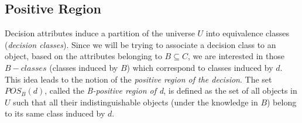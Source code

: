 \documentclass[authoryear,11pt]{elsarticle}
\begin{document}
%  
%  
%  
%  
%  
%  
%  
  
\subsection{Positive Region}\label{subsect_Pos}
  Decision attributes induce a partition of the universe $U$ into equivalence classes 
  (\textit{decision classes}). Since we will be trying to associate a decision class to an object, 
  based on the attributes belonging to $B \subseteq C$, we are interested in those 
  $B-classes$ (classes induced by $B$) which correspond to classes induced by $d$. 
  This idea leads to the notion of the  \textit{positive region of the decision}. The set $POS_B(d)$, 
  called the \textit{B-positive region of d}, is defined as the set of all objects in $U$ such 
  that all their indistinguishable objects (under the knowledge in $B$) belong to its same class induced 
  by $d$.
  
\end{document}
